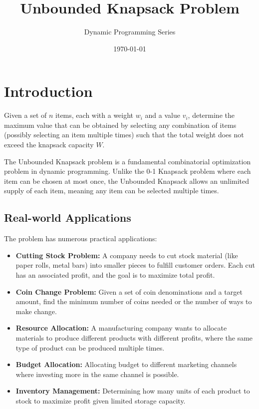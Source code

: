 \documentclass{article}
\title{\Huge \textbf{Unbounded Knapsack Problem}}
\author{Dynamic Programming Series}
\date{\today}
\begin{document}
\maketitle

\section{Introduction}

\begin{tcolorbox}[theorembox, title=Problem Statement]
Given a set of $n$ items, each with a weight $w_i$ and a value $v_i$, determine the maximum value that can be obtained by selecting any combination of items (possibly selecting an item multiple times) such that the total weight does not exceed the knapsack capacity $W$.
\end{tcolorbox}

The Unbounded Knapsack problem is a fundamental combinatorial optimization problem in dynamic programming. Unlike the 0-1 Knapsack problem where each item can be chosen at most once, the Unbounded Knapsack allows an unlimited supply of each item, meaning any item can be selected multiple times.

\subsection{Real-world Applications}

The problem has numerous practical applications:

\begin{itemize}[leftmargin=*]
  \item \textbf{Cutting Stock Problem:} A company needs to cut stock material (like paper rolls, metal bars) into smaller pieces to fulfill customer orders. Each cut has an associated profit, and the goal is to maximize total profit.
  
  \item \textbf{Coin Change Problem:} Given a set of coin denominations and a target amount, find the minimum number of coins needed or the number of ways to make change.
  
  \item \textbf{Resource Allocation:} A manufacturing company wants to allocate materials to produce different products with different profits, where the same type of product can be produced multiple times.
  
  \item \textbf{Budget Allocation:} Allocating budget to different marketing channels where investing more in the same channel is possible.
  
  \item \textbf{Inventory Management:} Determining how many units of each product to stock to maximize profit given limited storage capacity.
\end{itemize}
\end{document}
